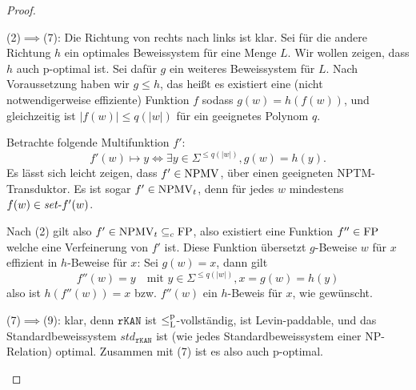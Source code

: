 \begin{proof}
\begin{prooflist}
\item (2)$\implies$(7): Die Richtung von rechts nach links ist klar. Sei für die andere Richtung $h$ ein optimales Beweissystem für eine Menge $L$. Wir wollen zeigen, dass $h$ auch p-optimal ist. Sei dafür $g$ ein weiteres Beweissystem für $L$. Nach Voraussetzung haben wir $g\leq h$, das heißt es existiert eine (nicht notwendigerweise effiziente) Funktion $f$ sodass $g(w)=h(f(w))$, und gleichzeitig ist $|f(w)|\leq q(|w|)$ für ein geeignetes Polynom $q$.

Betrachte folgende Multifunktion $f'$:
\[ f'(w) \mapsto y \iff \exists y\in\Sigma^{\leq q(|w|)}, g(w)=h(y). \]
Es lässt sich leicht zeigen, dass $f'\in\mathrm{NPMV}$, über einen geeigneten NPTM-Transduktor. 
Es ist sogar $f'\in\mathrm{NPMV}_t$, denn für jedes $w$ mindestens $f(w)\in \mathit{set}\text{-}{}f'(w)$.

Nach (2) gilt also $f'\in\mathrm{NPMV}_t\subseteq_c \mathrm{FP}$, also existiert eine Funktion $f''\in\mathrm{FP}$ welche eine Verfeinerung von $f'$ ist. Diese Funktion übersetzt $g$-Beweise $w$ für $x$ effizient in $h$-Beweise für $x$: 
Sei $g(w)=x$, dann gilt
\[ f''(w) = y \quad\text{mit } y\in\Sigma^{\leq q(|w|)}, x=g(w)=h(y) \]
also ist $h(f''(w))=x$ bzw. $f''(w)$ ein $h$-Beweis für $x$, wie gewünscht.


\item (7)$\implies$(9): klar, denn $\mathtt{rKAN}$ ist $\leq_\mathrm{L}^\mathrm{p}$-vollständig, ist Levin-paddable, und das Standardbeweissystem $\mathit{std}_\mathtt{rKAN}$ ist (wie jedes Standardbeweissystem einer NP-Relation) optimal. Zusammen mit (7) ist es also auch p-optimal.
\end{prooflist}
\end{proof}

